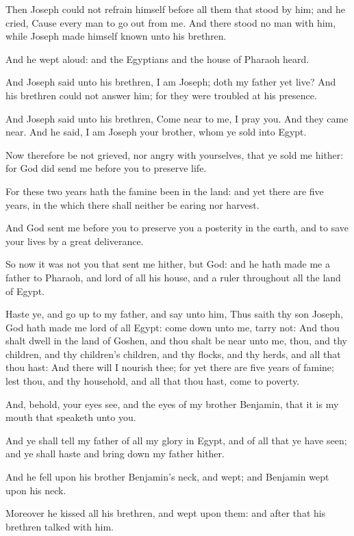 \verse Then Joseph could not refrain himself before all them that stood by him; and he cried, Cause every man to go out from me. And there stood no man with him, while Joseph made himself known unto his brethren.

\verse And he wept aloud: and the Egyptians and the house of Pharaoh heard.

\verse And Joseph said unto his brethren, I am Joseph; doth my father yet live? And his brethren could not answer him; for they were troubled at his presence.

\verse And Joseph said unto his brethren, Come near to me, I pray you.  And they came near. And he said, I am Joseph your brother, whom ye sold into Egypt.

\verse Now therefore be not grieved, nor angry with yourselves, that ye sold me hither: for God did send me before you to preserve life.

\verse For these two years hath the famine been in the land: and yet there are five years, in the which there shall neither be earing nor harvest.

\verse And God sent me before you to preserve you a posterity in the earth, and to save your lives by a great deliverance.

\verse So now it was not you that sent me hither, but God: and he hath made me a father to Pharaoh, and lord of all his house, and a ruler throughout all the land of Egypt.

\verse Haste ye, and go up to my father, and say unto him, Thus saith thy son Joseph, God hath made me lord of all Egypt: come down unto me, tarry not: \verse And thou shalt dwell in the land of Goshen, and thou shalt be near unto me, thou, and thy children, and thy children's children, and thy flocks, and thy herds, and all that thou hast: \verse And there will I nourish thee; for yet there are five years of famine; lest thou, and thy household, and all that thou hast, come to poverty.

\verse And, behold, your eyes see, and the eyes of my brother Benjamin, that it is my mouth that speaketh unto you.

\verse And ye shall tell my father of all my glory in Egypt, and of all that ye have seen; and ye shall haste and bring down my father hither.

\verse And he fell upon his brother Benjamin's neck, and wept; and Benjamin wept upon his neck.

\verse Moreover he kissed all his brethren, and wept upon them: and after that his brethren talked with him.

